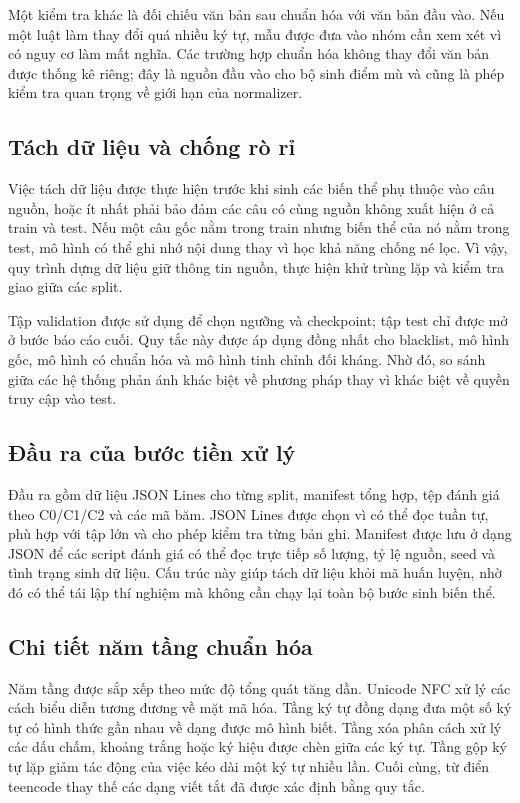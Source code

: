 \documentclass[12pt,a4paper]{article}
\begin{document}
Một kiểm tra khác là đối chiếu văn bản sau chuẩn hóa với văn bản đầu vào. Nếu một luật làm thay đổi quá nhiều ký tự, mẫu được đưa vào nhóm cần xem xét vì có nguy cơ làm mất nghĩa. Các trường hợp chuẩn hóa không thay đổi văn bản được thống kê riêng; đây là nguồn đầu vào cho bộ sinh điểm mù và cũng là phép kiểm tra quan trọng về giới hạn của normalizer.

\subsection{Tách dữ liệu và chống rò rỉ}
Việc tách dữ liệu được thực hiện trước khi sinh các biến thể phụ thuộc vào câu nguồn, hoặc ít nhất phải bảo đảm các câu có cùng nguồn không xuất hiện ở cả train và test. Nếu một câu gốc nằm trong train nhưng biến thể của nó nằm trong test, mô hình có thể ghi nhớ nội dung thay vì học khả năng chống né lọc. Vì vậy, quy trình dựng dữ liệu giữ thông tin nguồn, thực hiện khử trùng lặp và kiểm tra giao giữa các split.

Tập validation được sử dụng để chọn ngưỡng và checkpoint; tập test chỉ được mở ở bước báo cáo cuối. Quy tắc này được áp dụng đồng nhất cho blacklist, mô hình gốc, mô hình có chuẩn hóa và mô hình tinh chỉnh đối kháng. Nhờ đó, so sánh giữa các hệ thống phản ánh khác biệt về phương pháp thay vì khác biệt về quyền truy cập vào test.

\subsection{Đầu ra của bước tiền xử lý}
Đầu ra gồm dữ liệu JSON Lines cho từng split, manifest tổng hợp, tệp đánh giá theo C0/C1/C2 và các mã băm. JSON Lines được chọn vì có thể đọc tuần tự, phù hợp với tập lớn và cho phép kiểm tra từng bản ghi. Manifest được lưu ở dạng JSON để các script đánh giá có thể đọc trực tiếp số lượng, tỷ lệ nguồn, seed và tình trạng sinh dữ liệu. Cấu trúc này giúp tách dữ liệu khỏi mã huấn luyện, nhờ đó có thể tái lập thí nghiệm mà không cần chạy lại toàn bộ bước sinh biến thể.

\subsection{Chi tiết năm tầng chuẩn hóa}
Năm tầng được sắp xếp theo mức độ tổng quát tăng dần. Unicode NFC xử lý các cách biểu diễn tương đương về mặt mã hóa. Tầng ký tự đồng dạng đưa một số ký tự có hình thức gần nhau về dạng được mô hình biết. Tầng xóa phân cách xử lý các dấu chấm, khoảng trắng hoặc ký hiệu được chèn giữa các ký tự. Tầng gộp ký tự lặp giảm tác động của việc kéo dài một ký tự nhiều lần. Cuối cùng, từ điển teencode thay thế các dạng viết tắt đã được xác định bằng quy tắc.
\end{document}
